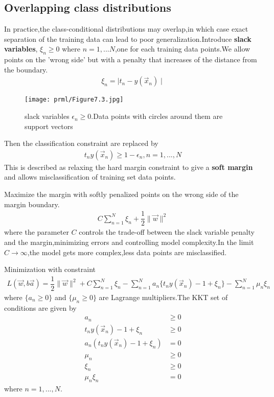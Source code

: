 \subsection{Overlapping class distributions}
In practice,the class-conditional distributions may overlap,in which case exact separation of the training data can lead to poor generalization.Introduce \textbf{slack variables}, $\xi_n\geq 0$ where $n=1,...N$,one for each training data points.We allow points on the 'wrong side' but with a penalty that increases of the distance from the boundary.
\begin{align}
\xi_n = \mid t_n-y(\vec{x}_n)\mid
\end{align}
\begin{SCfigure*}
	\caption{slack variables $\epsilon_n\geq 0$.Data points with circles around them are support vectors}
	\texttt{[image: prml/Figure7.3.jpg]}
\end{SCfigure*}

Then the classification constraint are replaced by
\begin{align}
t_n y(\vec{x}_n) \geq 1-\epsilon_n,n=1,...,N
\end{align}
This is described as relaxing the hard margin constraint to give a \textbf{soft margin} and allows misclassification of training set data points.

Maximize the margin with softly penalized points on the wrong side of the margin boundary.
\begin{align}
C\sum_{n=1}^{N}\xi_n +\dfrac{1}{2}\parallel\vec{w}\parallel^2
\end{align}
where the parameter $C$ controls the trade-off between the slack variable penalty and the margin,minimizing errors and controlling model complexity.In the limit $C\longrightarrow \infty$,the model gets more complex,less data points are misclassified.

Minimization with constraint
\begin{align}
L(\vec{w},b\vec{a}) =\dfrac{1}{2}\parallel\vec{w}\parallel^2+C\sum_{n=1}^{N}\xi_n-\sum_{n=1}^{N}a_n\{t_n y(\vec{x}_n)-1+\xi_n \} -\sum_{n=1}^{N}\mu_n\xi_n
\end{align}
where $\{a_n\geq 0\}$ and $\{\mu_n \geq 0 \}$ are Lagrange multipliers.The KKT set of conditions are given by
\begin{align}
a_n &\geq 0 \\
t_n y(\vec{x}_n)-1+\xi_n &\geq 0 \\
a_n(t_n y(\vec{x}_n)-1+\xi_n) &= 0 \\
\mu_n &\geq 0 \\
\xi_n &\geq 0 \\
\mu_n\xi_n &=0
\end{align}
where $n=1,...,N$.

